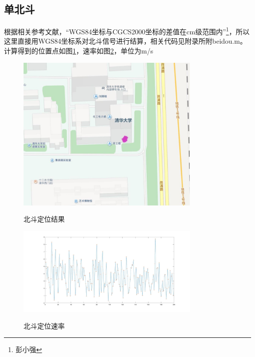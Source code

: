 \subsection{单北斗} 根据相关参考文献，“WGS84坐标与CGCS2000坐标的差值在cm级范围内”\footnote{彭小强}，所以这里直接用WGS84坐标系对北斗信号进行结算，相关代码见附录所附beidou.m。
    计算得到的位置点如图\ref{beidou}，速率如图\ref{v_beidou}，单位为m/s
\begin{figure}
    \centering
    \includegraphics[width=0.8\textwidth]{pic/beidou.jpg}\\
    \caption{北斗定位结果}
    \label{beidou}
\end{figure}
\begin{figure}
    \centering
    \includegraphics[width=0.8\textwidth]{pic/v_beidou.jpg}\\
    \caption{北斗定位速率}
    \label{v_beidou}
\end{figure}

